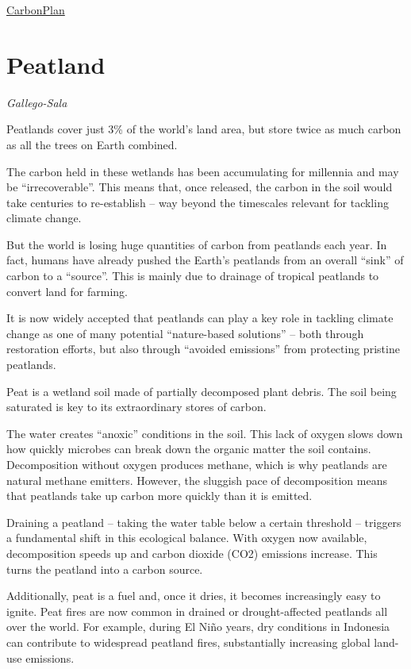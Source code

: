 \documentclass[
]{book}
\begin{document}
\href{https://carbonplan.org/research/soil-depth-sampling}{CarbonPlan}

\hypertarget{peatland}{%
\section{Peatland}\label{peatland}}

\emph{Gallego-Sala}

Peatlands cover just 3\% of the world's land area, but store twice as much carbon as all the trees on Earth combined.

The carbon held in these wetlands has been accumulating for millennia and may be ``irrecoverable''. This means that, once released, the carbon in the soil would take centuries to re-establish -- way beyond the timescales relevant for tackling climate change.

But the world is losing huge quantities of carbon from peatlands each year. In fact, humans have already pushed the Earth's peatlands from an overall ``sink'' of carbon to a ``source''. This is mainly due to drainage of tropical peatlands to convert land for farming.

It is now widely accepted that peatlands can play a key role in tackling climate change as one of many potential ``nature-based solutions'' -- both through restoration efforts, but also through ``avoided emissions'' from protecting pristine peatlands.

Peat is a wetland soil made of partially decomposed plant debris. The soil being saturated is key to its extraordinary stores of carbon.

The water creates ``anoxic'' conditions in the soil. This lack of oxygen slows down how quickly microbes can break down the organic matter the soil contains. Decomposition without oxygen produces methane, which is why peatlands are natural methane emitters. However, the sluggish pace of decomposition means that peatlands take up carbon more quickly than it is emitted.

Draining a peatland -- taking the water table below a certain threshold -- triggers a fundamental shift in this ecological balance. With oxygen now available, decomposition speeds up and carbon dioxide (CO2) emissions increase. This turns the peatland into a carbon source.

Additionally, peat is a fuel and, once it dries, it becomes increasingly easy to ignite. Peat fires are now common in drained or drought-affected peatlands all over the world. For example, during El Niño years, dry conditions in Indonesia can contribute to widespread peatland fires, substantially increasing global land-use emissions.
\end{document}
